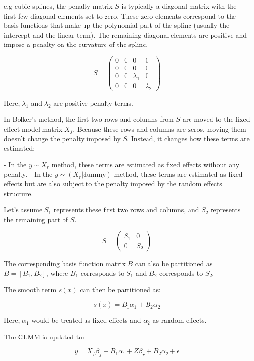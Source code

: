 \documentclass[12pt, twoside,hidelinks]{article}
\theoremstyle{definition}
\numberwithin{equation}{section}
\begin{document}
e.g cubic splines, the penalty matrix \( S \) is typically a diagonal matrix with the first few diagonal elements set to zero. These zero elements correspond to the basis functions that make up the polynomial part of the spline (usually the intercept and the linear term). The remaining diagonal elements are positive and impose a penalty on the curvature of the spline.


\[
S = \begin{pmatrix}
0 & 0 & 0 & 0 \\
0 & 0 & 0 & 0 \\
0 & 0 & \lambda_1 & 0 \\
0 & 0 & 0 & \lambda_2
\end{pmatrix}
\]

Here, \( \lambda_1 \) and \( \lambda_2 \) are positive penalty terms.

In Bolker's method, the first two rows and columns from \( S \) are moved to the fixed effect model matrix \( X_f \). Because these rows and columns are zeros, moving them doesn't change the penalty imposed by \( S \). Instead, it changes how these terms are estimated:

- In the \( y \sim X_r \) method, these terms are estimated as fixed effects without any penalty.
- In the \( y \sim (X_r | \text{dummy}) \) method, these terms are estimated as fixed effects but are also subject to the penalty imposed by the random effects structure.
\newline

 Let's assume \(S_1\) represents these first two rows and columns, and \(S_2\) represents the remaining part of \(S\).

\[
S = \begin{pmatrix}
S_1 & 0 \\
0 & S_2
\end{pmatrix}
\]

The corresponding basis function matrix \(B\) can also be partitioned as \(B = [B_1, B_2]\), where \(B_1\) corresponds to \(S_1\) and \(B_2\) corresponds to \(S_2\).

The smooth term \(s(x)\) can then be partitioned as:

\[
s(x) = B_1 \alpha_1 + B_2 \alpha_2
\]

Here, \(\alpha_1\) would be treated as fixed effects and \(\alpha_2\) as random effects.


The GLMM is updated to:

\[
y = X_f \beta_f + B_1 \alpha_1 + Z \beta_r + B_2 \alpha_2 + \epsilon
\]
\end{document}
